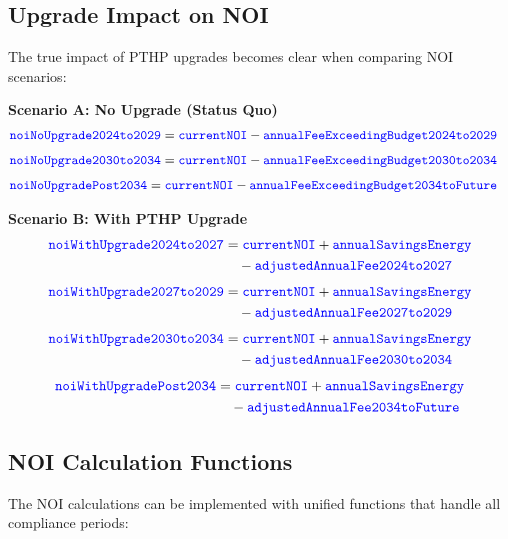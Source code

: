 \documentclass{article}
\newcommand{\code}[1]{\textcolor{blue}{\texttt{#1}}}
\begin{document}
\subsection{Upgrade Impact on NOI}

The true impact of PTHP upgrades becomes clear when comparing NOI scenarios:

\textbf{Scenario A: No Upgrade (Status Quo)}
\begin{align}
\code{noiNoUpgrade2024to2029} &= \code{currentNOI} - \code{annualFeeExceedingBudget2024to2029}
\end{align}
\begin{align}
\code{noiNoUpgrade2030to2034} &= \code{currentNOI} - \code{annualFeeExceedingBudget2030to2034}
\end{align}
\begin{align}
\code{noiNoUpgradePost2034} &= \code{currentNOI} - \code{annualFeeExceedingBudget2034toFuture}
\end{align}

\textbf{Scenario B: With PTHP Upgrade}
\begin{align}
\code{noiWithUpgrade2024to2027} &= \code{currentNOI} + \code{annualSavingsEnergy} \nonumber\\
&\quad - \code{adjustedAnnualFee2024to2027}
\end{align}
\begin{align}
\code{noiWithUpgrade2027to2029} &= \code{currentNOI} + \code{annualSavingsEnergy} \nonumber\\
&\quad - \code{adjustedAnnualFee2027to2029}
\end{align}
\begin{align}
\code{noiWithUpgrade2030to2034} &= \code{currentNOI} + \code{annualSavingsEnergy} \nonumber\\
&\quad - \code{adjustedAnnualFee2030to2034}
\end{align}
\begin{align}
\code{noiWithUpgradePost2034} &= \code{currentNOI} + \code{annualSavingsEnergy} \nonumber\\
&\quad - \code{adjustedAnnualFee2034toFuture}
\end{align}

\subsection{NOI Calculation Functions}

The NOI calculations can be implemented with unified functions that handle all compliance periods:
\end{document}
